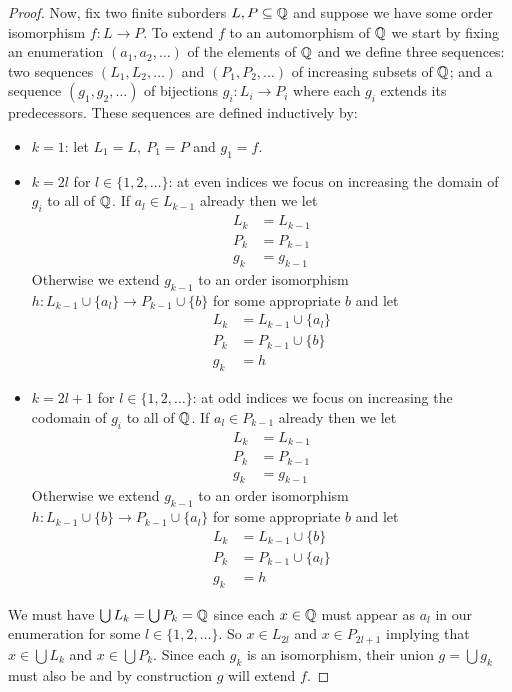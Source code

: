 \begin{proof}
  Now, fix two finite suborders $L,P \subseteq \mathbb{Q}$
  and suppose we have some order isomorphism $f : L \to P$. To extend $f$ to an automorphism of $\mathbb{Q}$
  we start by fixing an enumeration $(a_1, a_2, \dots)$ of the elements of $\mathbb{Q}$ and we define
  three sequences: two sequences
  $(L_1, L_2, \dots)$ and $(P_1, P_2, \dots)$ of increasing subsets of $\mathbb{Q}$; and a sequence 
  $(g_1, g_2, \dots)$ of bijections $g_i : L_i \to P_i$ where each $g_i$ extends its predecessors.
  These sequences are defined inductively by:
  \begin{itemize}
    \item $k = 1$: let $L_1 = L,\ P_1 = P$ and $g_1 = f$.
    \item $k = 2l$ for $l \in \{1, 2, \dots\}$: at even indices we focus on increasing the domain of
      $g_i$ to all of $\mathbb{Q}$. If $a_l \in L_{k-1}$ already then we let
      \begin{align*}
        L_k & = L_{k-1} \\
        P_k & = P_{k-1} \\
        g_k & = g_{k-1}
      \end{align*}
      Otherwise we extend $g_{k-1}$ to an order isomorphism
      $h : L_{k-1} \cup \{a_l\} \to P_{k-1} \cup \{b\}$ for some appropriate $b$ and let
      \begin{align*}
        L_k & = L_{k-1} \cup \{a_l\} \\
        P_k & = P_{k-1} \cup \{b\} \\
        g_k & = h
      \end{align*}
    \item $k = 2l + 1$ for $l \in \{1, 2, \dots\}$: at odd indices we focus on increasing the
      codomain of $g_i$ to all of $\mathbb{Q}$. If $a_l \in P_{k-1}$ already then we let
      \begin{align*}
        L_k & = L_{k-1} \\
        P_k & = P_{k-1} \\
        g_k & = g_{k-1}
      \end{align*}
      Otherwise we extend $g_{k-1}$ to an order isomorphism
      $h : L_{k-1} \cup \{b\} \to P_{k-1} \cup \{a_l\}$ for some appropriate $b$ and let
      \begin{align*}
        L_k & = L_{k-1} \cup \{b\} \\
        P_k & = P_{k-1} \cup \{a_l\} \\
        g_k & = h
      \end{align*}
  \end{itemize}
  We must have $\bigcup L_k = \bigcup P_k = \mathbb{Q}$ since each $x \in \mathbb{Q}$ must appear as $a_l$
  in our enumeration for some $l \in \{1, 2, \dots\}$. So $x \in L_{2l}$ and $x \in P_{2l+1}$
  implying that $x \in \bigcup L_k$ and $x \in \bigcup P_k$. Since each $g_k$ is an isomorphism,
  their union $g = \bigcup g_k$ must also be and by construction $g$ will extend $f$.
\end{proof}


